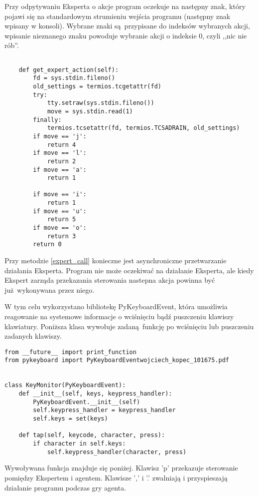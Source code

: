 Przy odpytywaniu Eksperta o akcje program oczekuje na następny znak, który pojawi się na standardowym strumieniu wejścia programu (następny znak wpisany w konsoli). Wybrane znaki są przypisane do indeksów wybranych akcji, wpisanie nieznanego znaku powoduje wybranie akcji o indeksie 0, czyli ,,nic nie rób''.

\begin{lstlisting}[language=iPython]

    def get_expert_action(self):
        fd = sys.stdin.fileno()
        old_settings = termios.tcgetattr(fd)
        try:
            tty.setraw(sys.stdin.fileno())
            move = sys.stdin.read(1)
        finally:
            termios.tcsetattr(fd, termios.TCSADRAIN, old_settings)
        if move == 'j':
            return 4
        if move == 'l':
            return 2
        if move == 'a':
            return 1

        if move == 'i':
            return 1
        if move == 'u':
            return 5
        if move == 'o':
            return 3
        return 0
\end{lstlisting}

Przy metodzie \ref{expert_call} konieczne jest asynchroniczne przetwarzanie działania Eksperta. Program nie może oczekiwać na działanie Eksperta, ale kiedy Ekspert zarząda przekazania sterowania nastepna akcja powinna być już wykonywana przez niego.

W tym celu wykorzystano bibliotekę PyKeyboardEvent, która umożliwia reagowanie na systemowe informacje o wciśnięciu bądź puszczeniu klawiszy klawiatury. Poniższa klasa wywołuje zadaną funkcję po wciśnięciu lub puszczeniu zadanych klawiszy.


\begin{lstlisting}[language=iPython]
from __future__ import print_function
from pykeyboard import PyKeyboardEventwojciech_kopec_101675.pdf


class KeyMonitor(PyKeyboardEvent):
    def __init__(self, keys, keypress_handler):
        PyKeyboardEvent.__init__(self)
        self.keypress_handler = keypress_handler
        self.keys = set(keys)

    def tap(self, keycode, character, press):
        if character in self.keys:
            self.keypress_handler(character, press)
\end{lstlisting}

Wywoływana funkcja znajduje się poniżej. Klawisz 'p' przekazuje sterowanie pomiędzy Ekspertem i agentem. Klawisze ',' i '.' zwalniają i przyspieszają działanie programu podczas gry agenta.


